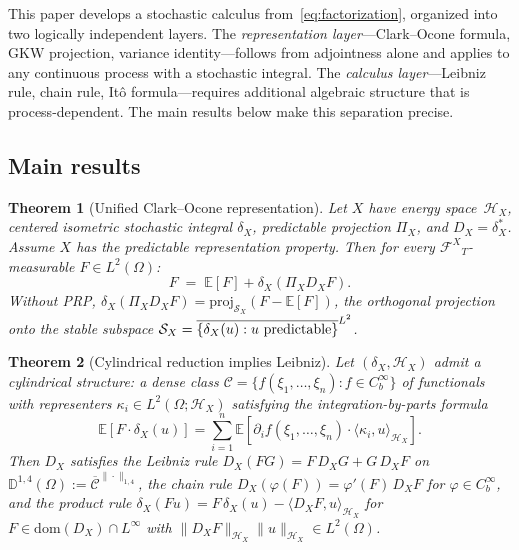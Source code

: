 \documentclass[11pt,a4paper]{article}
\theoremstyle{plain}
\newtheorem{mainthm}{Theorem}
\theoremstyle{definition}
\theoremstyle{remark}
\newcommand{\E}{\mathbb{E}}
\newcommand{\dom}{\mathrm{dom}}
\newcommand{\HX}{\mathcal{H}_X}
\newcommand{\FX}{\mathcal{F}^X}
\begin{document}
This paper develops a stochastic calculus from~\eqref{eq:factorization}, organized into two logically independent layers. The \emph{representation layer}---Clark--Ocone formula, GKW projection, variance identity---follows from adjointness alone and applies to any continuous process with a stochastic integral. The \emph{calculus layer}---Leibniz rule, chain rule, It\^o formula---requires additional algebraic structure that is process-dependent. The main results below make this separation precise.


\subsection{Main results}

\begin{mainthm}[Unified Clark--Ocone representation]\label{thmA}
Let $X$ have energy space~$\HX$, centered isometric stochastic integral $\delta_X$, predictable projection $\Pi_X$, and $D_X = \delta_X^*$. Assume $X$ has the predictable representation property. Then for every ${\FX}_T$-measurable $F \in L^2(\Omega)$:
\[
F \;=\; \E[F] + \delta_X(\Pi_X D_X F).
\]
Without PRP, $\delta_X(\Pi_X D_X F) = \mathrm{proj}_{\mathcal{S}_X}(F - \E[F])$, the orthogonal projection onto the stable subspace $\mathcal{S}_X = \overline{\{\delta_X(u) : u \textup{ predictable}\}}^{L^2}$.
\end{mainthm}

\begin{mainthm}[Cylindrical reduction implies Leibniz]\label{thmB}
Let $(\delta_X, \HX)$ admit a cylindrical structure: a dense class $\mathcal{C} = \{f(\xi_1,\ldots,\xi_n) : f \in C_b^\infty\}$ of functionals with representers $\kappa_i \in L^2(\Omega;\HX)$ satisfying the integration-by-parts formula
\[
\E[F\cdot\delta_X(u)] = \sum_{i=1}^n \E[\partial_if(\xi_1,\ldots,\xi_n)\cdot\langle\kappa_i,u\rangle_{\HX}].
\]
Then $D_X$ satisfies the Leibniz rule $D_X(FG) = F\,D_X G + G\,D_X F$ on $\mathbb{D}^{1,4}(\Omega) := \overline{\mathcal{C}}^{\|\cdot\|_{1,4}}$, the chain rule $D_X(\varphi(F)) = \varphi'(F)\,D_X F$ for $\varphi \in C_b^\infty$, and the product rule $\delta_X(Fu) = F\,\delta_X(u) - \langle D_X F, u \rangle_{\HX}$ for $F \in \dom(D_X)\cap L^\infty$ with $\|D_XF\|_{\HX}\|u\|_{\HX} \in L^2(\Omega)$.
\end{mainthm}
\end{document}
